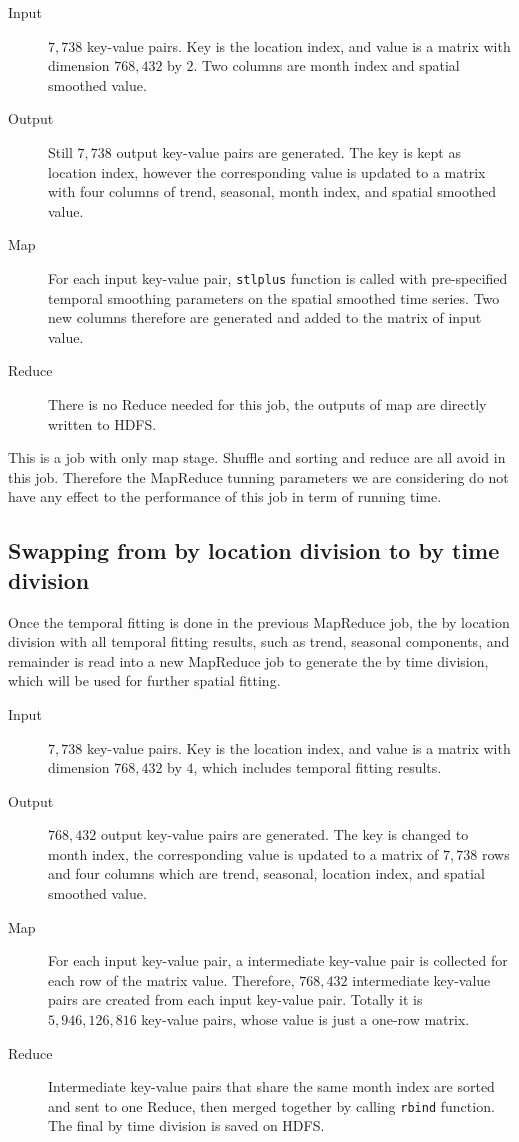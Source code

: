 \begin{description}
\item[Input] $7,738$ key-value pairs. Key is the location index, and value is a 
matrix with dimension $768,432$ by $2$. Two columns are month index and spatial
smoothed value.
\item[Output] Still $7,738$ output key-value pairs are generated. The key is kept
as location index, however the corresponding value is updated to a matrix with 
four columns of trend, seasonal, month index, and spatial smoothed value. 
\item[Map] For each input key-value pair, \texttt{stlplus} function is called
with pre-specified temporal smoothing parameters on the spatial smoothed time
series. Two new columns therefore are generated and added to the matrix of input
value. 
\item[Reduce] There is no Reduce needed for this job, the outputs of map are 
directly written to HDFS.
\end{description}

This is a job with only map stage. Shuffle and sorting and reduce are all avoid 
in this job. Therefore the MapReduce tunning parameters we are considering do
not have any effect to the performance of this job in term of running time.

\subsection{Swapping from by location division to by time division}
\label{sec:swaptotime}
Once the temporal fitting is done in the previous MapReduce job, the by location
division with all temporal fitting results, such as trend, seasonal components,
and remainder is read into a new MapReduce job to generate the by time division,
which will be used for further spatial fitting.

\begin{description}
\item[Input] $7,738$ key-value pairs. Key is the location index, and value is a 
matrix with dimension $768,432$ by $4$, which includes temporal fitting results.
\item[Output] $768,432$ output key-value pairs are generated. The key is changed
to month index, the corresponding value is updated to a matrix of $7,738$ rows 
and four columns which are trend, seasonal, location index, and spatial smoothed 
value. 
\item[Map] For each input key-value pair, a intermediate key-value pair is 
collected for each row of the matrix value. Therefore, $768,432$ intermediate
key-value pairs are created from each input key-value pair. Totally it is 
$5,946,126,816$ key-value pairs, whose value is just a one-row matrix.
\item[Reduce] Intermediate key-value pairs that share the same month index are 
sorted and sent to one Reduce, then merged together by calling \texttt{rbind}
function. The final by time division is saved on HDFS.
\end{description}

